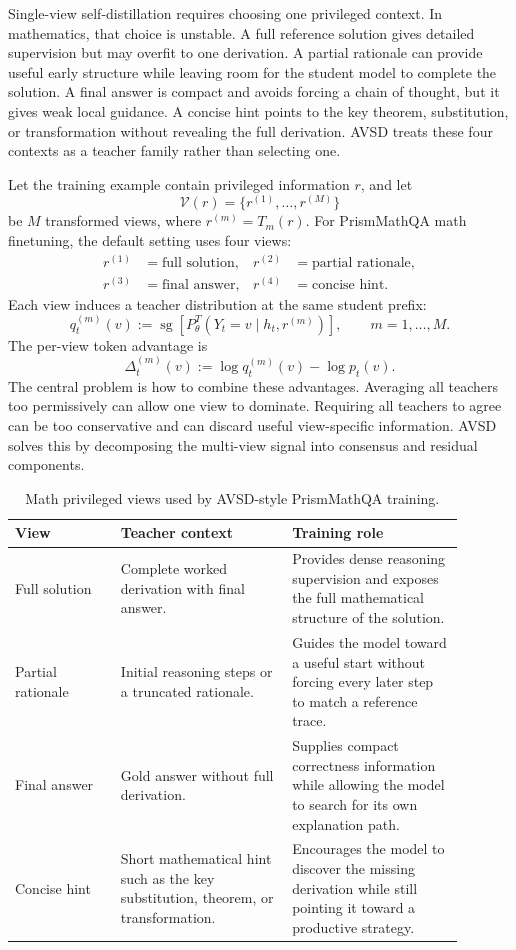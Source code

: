 Single-view self-distillation requires choosing one privileged context. In mathematics, that choice is unstable. A full reference solution gives detailed supervision but may overfit to one derivation. A partial rationale can provide useful early structure while leaving room for the student model to complete the solution. A final answer is compact and avoids forcing a chain of thought, but it gives weak local guidance. A concise hint points to the key theorem, substitution, or transformation without revealing the full derivation. AVSD treats these four contexts as a teacher family rather than selecting one.

Let the training example contain privileged information $r$, and let
\[
    \mathcal{V}(r)=\{r^{(1)},\ldots,r^{(M)}\}
\]
be $M$ transformed views, where $r^{(m)}=T_m(r)$. For PrismMathQA math finetuning, the default setting uses four views:
\[
\begin{aligned}
    r^{(1)}&=\text{full solution}, &
    r^{(2)}&=\text{partial rationale},\\
    r^{(3)}&=\text{final answer}, &
    r^{(4)}&=\text{concise hint}.
\end{aligned}
\]
Each view induces a teacher distribution at the same student prefix:
\[
    q_t^{(m)}(v)
    := \operatorname{sg}\left[P_{\theta}^{T}(Y_t=v\mid h_t,r^{(m)})\right],
    \qquad m=1,\ldots,M.
\]
The per-view token advantage is
\[
    \Delta_t^{(m)}(v)
    := \log q_t^{(m)}(v)-\log p_t(v).
\]
The central problem is how to combine these advantages. Averaging all teachers too permissively can allow one view to dominate. Requiring all teachers to agree can be too conservative and can discard useful view-specific information. AVSD solves this by decomposing the multi-view signal into consensus and residual components.

\begin{table}[t]
\centering
\caption{Math privileged views used by AVSD-style PrismMathQA training.}
\label{tab:math-views}
\small
\begin{tabular}{p{0.21\linewidth}p{0.34\linewidth}p{0.34\linewidth}}
\toprule
View & Teacher context & Training role \\
\midrule
Full solution & Complete worked derivation with final answer. & Provides dense reasoning supervision and exposes the full mathematical structure of the solution. \\
\midrule
Partial rationale & Initial reasoning steps or a truncated rationale. & Guides the model toward a useful start without forcing every later step to match a reference trace. \\
\midrule
Final answer & Gold answer without full derivation. & Supplies compact correctness information while allowing the model to search for its own explanation path. \\
\midrule
Concise hint & Short mathematical hint such as the key substitution, theorem, or transformation. & Encourages the model to discover the missing derivation while still pointing it toward a productive strategy. \\
\bottomrule
\end{tabular}
\end{table}

